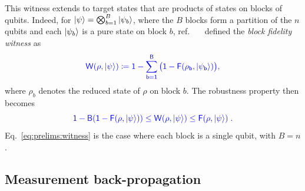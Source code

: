 \documentclass[a4paper,twocolumn,11pt,unpublished]{../../revision/quantumarticle}
\providecommand{\DIFadd}[1]{{\protect\color{blue} \sf #1}} %
\providecommand{\DIFaddbegin}{} %
\providecommand{\DIFaddend}{} %
\begin{document}
\DIFaddbegin \DIFadd{This witness extends to target states that are products of states on blocks of qubits. Indeed,
for $\ket{\psi}=\bigotimes_{b=1}^{B}\ket{\psi_b}$, where the $B$ blocks form a partition of the $n$ qubits and each $\ket{\psi_b}$ is a pure state on block $b$, ref.~\mbox{%
\cite{UC24efficient} }\hskip0pt%
defined the }\emph{\DIFadd{block fidelity witness}} \DIFadd{as
}\begin{equation}
    \DIFadd{\label{eq:prelims:blockwitness}
    W(\rho, \ket{\psi})
    \coloneqq 1 -
    \sum_{b=1}^{B}
    \big(1 - F(\rho_b, \ket{\psi_b})\big),
}\end{equation}
\DIFadd{where $\rho_b$ denotes the reduced state of $\rho$ on block $b$. The robustness property then becomes
}\begin{equation}
    \DIFadd{\label{eq:prelims:blockwitness:robustness}
    1-B(1-F(\rho, \ket\psi)) \leq W(\rho, \ket\psi)\leq F(\rho, \ket\psi)\; .
}\end{equation}
\DIFadd{Eq.~\eqref{eq:prelims:witness} is the case where each block is a single qubit, with $B=n$.
}


\DIFaddend \subsection{Measurement back-propagation}
\label{subsection:prelims:backprop}
\end{document}
